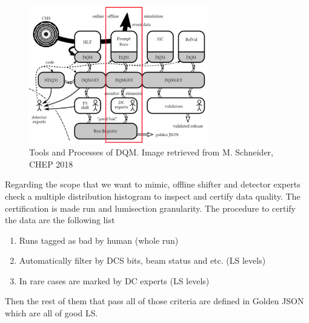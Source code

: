 \begin{figure}[h!]
    \centering
    \includegraphics[width=0.7\textwidth]{images/dqm_flow.png}
    \caption{Tools and Processes of DQM. Image retrieved from M. Schneider, CHEP 2018}
    \label{fig:dqm_flow}
\end{figure}

Regarding the scope that we want to mimic, offline shifter and detector experts check a multiple distribution histogram to inspect and certify data quality.
The certification is made run and lumisection granularity. The procedure to certify the data are the following list
\begin{enumerate}
    \item Runs tagged as bad by human (whole run)
    \item Automatically filter by DCS bits, beam status and etc. (LS levels)
    \item In rare cases are marked by DC experts (LS levels)
\end{enumerate}
Then the rest of them that pass all of those criteria are defined in Golden JSON which are all of good LS.

